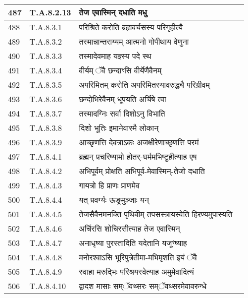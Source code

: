 \documentclass[17pt]{extarticle}
\begin{document}
\begin{longtable}{||p{0.4in}||p{0.9in}||p{4.0in}||p{0.9in}||}
        \hline
            487 & T.A.8.2.13 & तेज एवास्मिन् दधाति मधु &      \\
        \hline
            488 & T.A.8.3.1 & परिश्रिते करोति ब्रह्मवर्चसस्य परिगृहीत्यै &      \\
        \hline
            489 & T.A.8.3.2 & तस्मान्नान्तराय्यम् आत्मनो गोपीथाय वेणुना &      \\
        \hline
            490 & T.A.8.3.3 & तस्मादेवमाह यज्ञ्स्य पदे स्थ &      \\
        \hline
            491 & T.A.8.3.4 & वीर्यम् ॅवै छन्दाꣳसि वीर्येणैवैनम् &      \\
        \hline
            492 & T.A.8.3.5 & अपरिमितम् करोति अपरिमितस्यावरुद्ध्यै परिग्रीवम् &      \\
        \hline
            493 & T.A.8.3.6 & छन्दोभिरेवैनम् धूपयति अर्चिषे त्वा &      \\
        \hline
            494 & T.A.8.3.7 & तस्मादग्निः सर्वा दिशोऽनु विभाति &      \\
        \hline
            495 & T.A.8.3.8 & दिशो भूतिः इमानेवास्मै लोकान् &      \\
        \hline
            496 & T.A.8.3.9 & आच्छृणत्ति देवत्राऽकः अजक्षीरेणाच्छृणत्ति परमं &      \\
        \hline
            497 & T.A.8.4.1 & ब्रह्मन् प्रचरिष्यामो होतर्{-}घर्ममभिष्टुहीत्याह एष &      \\
        \hline
            498 & T.A.8.4.2 & अभिपूर्वम् प्रोक्षति अभिपूर्व{-}मेवास्मिन्{-}तेजो दधाति &      \\
        \hline
            499 & T.A.8.4.3 & गायत्रो हि प्राणः प्राणमेव &      \\
        \hline
            500 & T.A.8.4.4 & यत् प्रवर्ग्यः ऊङ्र्मुञ्जाः यन् &      \\
        \hline
            501 & T.A.8.4.5 & तेजसैवैनमनक्ति पृथिवीम् तपसस्त्रायस्वेति हिरण्यमुपास्यति &      \\
        \hline
            502 & T.A.8.4.6 & अर्चिरसि शोचिरसीत्याह तेज एवास्मिन् &      \\
        \hline
            503 & T.A.8.4.7 & अनाधृष्या पुरस्तादिति यदेतानि यजूꣳष्याह &      \\
        \hline
            504 & T.A.8.4.8 & मनोरश्वाऽसि भूरिपुत्रेतीमा{-}मभिमृशति इयं ॅवै &      \\
        \hline
            505 & T.A.8.4.9 & स्वाहा मरुद्भिः परिश्रयस्वेत्याह अमुमेवादित्यं &      \\
        \hline
            506 & T.A.8.4.10 & द्वादश मासाः सम्ॅवथ्सरः सम्ॅवथ्सरमेवावरुन्धे &      \\

\end{longtable}
\end{document}
